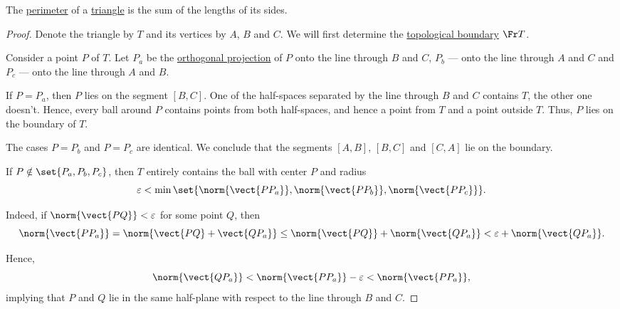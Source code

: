 \begin{proposition}\label{thm:perimeter_of_triangle}
  The \hyperref[def:perimeter]{perimeter} of a \hyperref[def:triangle]{triangle} is the sum of the lengths of its sides.
\end{proposition}
\begin{proof}
  Denote the triangle by \( T \) and its vertices by \( A \), \( B \) and \( C \). We will first determine the \hyperref[def:topological_boundary_operator]{topological boundary} \( \Fr T \).

  Consider a point \( P \) of \( T \). Let \( P_a \) be the \hyperref[def:orthogonal_projection]{orthogonal projection} of \( P \) onto the line through \( B \) and \( C \), \( P_b \) --- onto the line through \( A \) and \( C \) and \( P_c \) --- onto the line through \( A \) and \( B \).

  If \( P = P_a \), then \( P \) lies on the segment \( [B, C] \). One of the half-spaces separated by the line through \( B \) and \( C \) contains \( T \), the other one doesn't. Hence, every ball around \( P \) contains points from both half-spaces, and hence a point from \( T \) and a point outside \( T \). Thus, \( P \) lies on the boundary of \( T \).

  The cases \( P = P_b \) and \( P = P_c \) are identical. We conclude that the segments \( [A, B] \), \( [B, C] \) and \( [C, A] \) lie on the boundary.

  If \( P \notin \set{ P_a, P_b, P_c } \), then \( T \) entirely contains the ball with center \( P \) and radius
  \begin{equation*}
    \varepsilon < \min\set{ \norm{\vect{P P_a}}, \norm{\vect{P P_b}}, \norm{\vect{P P_c}} }.
  \end{equation*}

  Indeed, if \( \norm{\vect{PQ}} < \varepsilon \) for some point \( Q \), then
  \begin{equation*}
    \norm{\vect{P P_a}}
    =
    \norm{\vect{P Q} + \vect{Q P_a}}
    \leq
    \norm{\vect{P Q}} + \norm{\vect{Q P_a}}
    <
    \varepsilon + \norm{\vect{Q P_a}}.
  \end{equation*}

  Hence,
  \begin{equation*}
    \norm{\vect{Q P_a}} < \norm{\vect{P P_a}} - \varepsilon < \norm{\vect{P P_a}},
  \end{equation*}
  implying that \( P \) and \( Q \) lie in the same half-plane with respect to the line through \( B \) and \( C \).


\end{proof}
